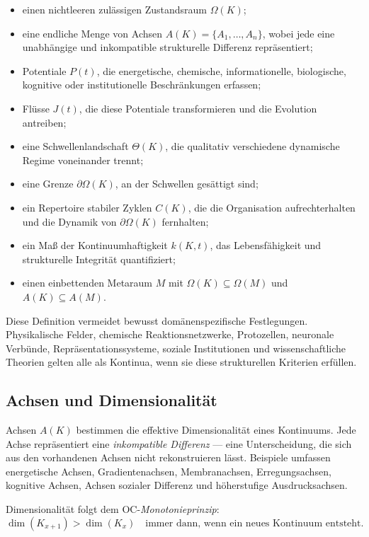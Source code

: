 \begin{itemize}
    \item einen nichtleeren zulässigen Zustandsraum \(\Omega(K)\);
    \item eine endliche Menge von Achsen \(A(K)=\{A_1,\dots,A_n\}\), wobei jede eine unabhängige und inkompatible strukturelle Differenz repräsentiert;
    \item Potentiale \(P(t)\), die energetische, chemische, informationelle, biologische, kognitive oder institutionelle Beschränkungen erfassen;
    \item Flüsse \(J(t)\), die diese Potentiale transformieren und die Evolution antreiben;
    \item eine Schwellenlandschaft \(\Theta(K)\), die qualitativ verschiedene dynamische Regime voneinander trennt;
    \item eine Grenze \(\partial\Omega(K)\), an der Schwellen gesättigt sind;
    \item ein Repertoire stabiler Zyklen \(C(K)\), die die Organisation aufrechterhalten und die Dynamik von \(\partial\Omega(K)\) fernhalten;
    \item ein Maß der Kontinuumhaftigkeit \(k(K,t)\), das Lebensfähigkeit und strukturelle Integrität quantifiziert;
    \item einen einbettenden Metaraum \(M\) mit \(\Omega(K)\subseteq\Omega(M)\) und \(A(K)\subseteq A(M)\).
\end{itemize}

Diese Definition vermeidet bewusst domänenspezifische Festlegungen.  
Physikalische Felder, chemische Reaktionsnetzwerke, Protozellen, neuronale Verbünde, Repräsentationssysteme, soziale Institutionen und wissenschaftliche Theorien gelten alle als Kontinua, wenn sie diese strukturellen Kriterien erfüllen.

\subsection{Achsen und Dimensionalität}

Achsen \(A(K)\) bestimmen die effektive Dimensionalität eines Kontinuums.  
Jede Achse repräsentiert eine \emph{inkompatible Differenz} --- eine Unterscheidung, die sich aus den vorhandenen Achsen nicht rekonstruieren lässt.  
Beispiele umfassen energetische Achsen, Gradientenachsen, Membranachsen, Erregungsachsen, kognitive Achsen, Achsen sozialer Differenz und höherstufige Ausdrucksachsen.

Dimensionalität folgt dem OC-\emph{Monotonieprinzip}:
\[
\dim(K_{x+1}) > \dim(K_x)
\quad\text{immer dann, wenn ein neues Kontinuum entsteht}.
\]

